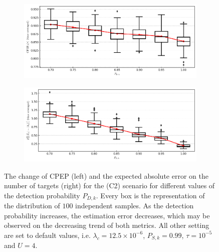 \begin{figure}
    \centering
    \begin{subfigure}[]{0.48\linewidth}
        \centering
        \includegraphics[width=\linewidth]{figures/c2-pd-cpep.png}
    \end{subfigure}
    \hfill
    \begin{subfigure}[]{0.48\linewidth}
        \centering
        \includegraphics[width=\linewidth]{figures/c2-pd-eae.png}
    \end{subfigure}
  \caption[(C2). Change of performance depending on the detection probability.]{The change of CPEP (left) and the expected absolute error on the number of targets (right) for the (C2) scenario for different values of the detection probability $P_{D,k}$. Every box is the representation of the distribution of $100$ independent samples. As the detection probability increases, the estimation error decreases, which may be observed on the decreasing trend of both metrics. All other setting are set to default values, i.e. $\lambda_{c} = 12.5 \times 10^{-6}$, $P_{S,k} = 0.99$, $\tau = 10^{-5}$ and $U = 4$.}
  \label{fig:c2-pd}
\end{figure}

